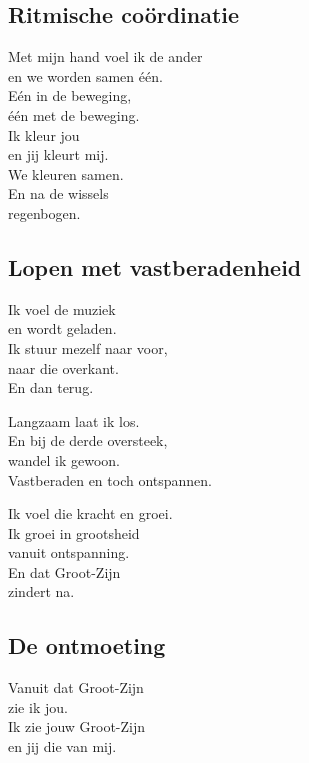 \documentclass[
  11pt,
]{book}
\begin{document}
\hypertarget{ritmische-couxf6rdinatie}{%
\subsection*{Ritmische coördinatie}\label{ritmische-couxf6rdinatie}}

Met mijn hand voel ik de ander\\
en we worden samen één.\\
Eén in de beweging,\\
één met de beweging.\\
Ik kleur jou\\
en jij kleurt mij.\\
We kleuren samen.\\
En na de wissels\\
regenbogen.

\hypertarget{lopen-met-vastberadenheid}{%
\subsection*{Lopen met vastberadenheid}\label{lopen-met-vastberadenheid}}

Ik voel de muziek\\
en wordt geladen.\\
Ik stuur mezelf naar voor,\\
naar die overkant.\\
En dan terug.

Langzaam laat ik los.\\
En bij de derde oversteek,\\
wandel ik gewoon.\\
Vastberaden en toch ontspannen.

Ik voel die kracht en groei.\\
Ik groei in grootsheid\\
vanuit ontspanning.\\
En dat Groot-Zijn\\
zindert na.

\hypertarget{de-ontmoeting}{%
\subsection*{De ontmoeting}\label{de-ontmoeting}}

Vanuit dat Groot-Zijn\\
zie ik jou.\\
Ik zie jouw Groot-Zijn\\
en jij die van mij.
\end{document}
